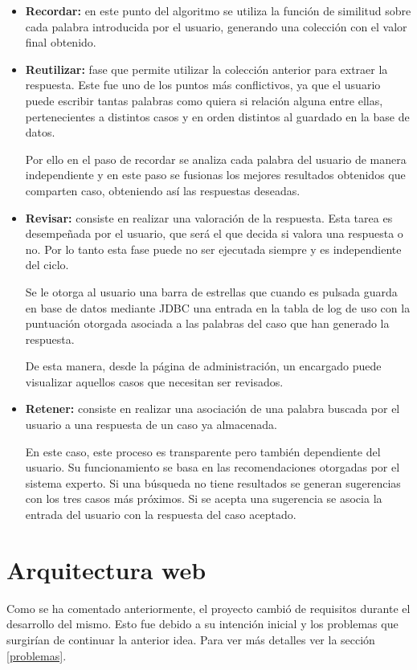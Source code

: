 \begin{itemize}
\tightlist
\item
\textbf{Recordar:} en este punto del algoritmo se utiliza la función de similitud sobre cada palabra introducida por el usuario, generando una colección con el valor final obtenido.
\item
\textbf{Reutilizar:} fase que permite utilizar la colección anterior para extraer la respuesta. Este fue uno de los puntos más conflictivos, ya que el usuario puede escribir tantas palabras como quiera si relación alguna entre ellas, pertenecientes a distintos casos y en orden distintos al guardado en la base de datos.

Por ello en el paso de recordar se analiza cada palabra del usuario de manera independiente y en este paso se fusionas los mejores resultados obtenidos que comparten caso, obteniendo así las respuestas deseadas.
\item
\textbf{Revisar:} consiste en realizar una valoración de la respuesta. Esta tarea es desempeñada por el usuario, que será el que decida si valora una respuesta o no. Por lo tanto esta fase puede no ser ejecutada siempre y es independiente del ciclo.

Se le otorga al usuario una barra de estrellas que cuando es pulsada guarda en base de datos mediante JDBC una entrada en la tabla de log de uso con la puntuación otorgada asociada a las palabras del caso que han generado la respuesta. 

De esta manera, desde la página de administración, un encargado puede visualizar aquellos casos que necesitan ser revisados.
\item
\textbf{Retener:} consiste en realizar una asociación de una palabra buscada por el usuario a una respuesta de un caso ya almacenada.

En este caso, este proceso es transparente pero también dependiente del usuario. Su funcionamiento se basa en las recomendaciones otorgadas por el sistema experto. Si una búsqueda no tiene resultados se generan sugerencias con los tres casos más próximos. Si se acepta una sugerencia se asocia la entrada del usuario con la respuesta del caso aceptado.
\end{itemize}

\section{Arquitectura web}

Como se ha comentado anteriormente, el proyecto cambió de requisitos durante el desarrollo del mismo. Esto fue debido a su intención inicial y los problemas que surgirían de continuar la anterior idea. Para ver más detalles ver la sección \ref{problemas}.

